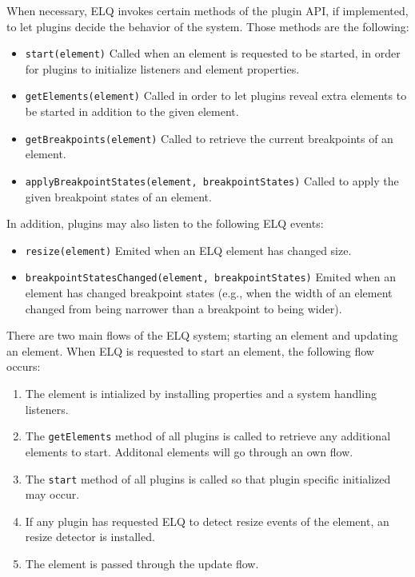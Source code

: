 \documentclass{acm_proc_article-sp}
\newcommand{\code}[1]{\texttt{#1}}
\newcommand{\elq}{ELQ}
\begin{document}
  When necessary, \elq{} invokes certain methods of the plugin API, if implemented, to let plugins decide the behavior of the system.
  Those methods are the following:
  \begin{itemize}
    \item \code{start(element)}
          Called when an element is requested to be started, in order for plugins to initialize listeners and element properties.
    \item \code{getElements(element)}
          Called in order to let plugins reveal extra elements to be started in addition to the given element.
    \item \code{getBreakpoints(element)}
          Called to retrieve the current breakpoints of an element.
    \item \code{applyBreakpointStates(element, breakpointStates)}
          Called to apply the given breakpoint states of an element.
  \end{itemize}

  In addition, plugins may also listen to the following \elq{} events:
  \begin{itemize}
    \item \code{resize(element)}
          Emited when an \elq{} element has changed size.
    \item \code{breakpointStatesChanged(element, breakpointStates)}
          Emited when an element has changed breakpoint states (e.g., when the width of an element changed from being narrower than a breakpoint to being wider).
  \end{itemize}

  There are two main flows of the \elq{} system; starting an element and updating an element.
  When \elq{} is requested to start an element, the following flow occurs:
  \begin{enumerate}
    \item The element is intialized by installing properties and a system handling listeners.
    \item 
          The \code{getElements} method of all plugins is called to retrieve any additional elements to start.
          Additonal elements will go through an own flow.
    \item The \code{start} method of all plugins is called so that plugin specific initialized may occur.
    \item If any plugin has requested \elq{} to detect resize events of the element, an resize detector is installed.
    \item The element is passed through the update flow.
  \end{enumerate}
\end{document}
